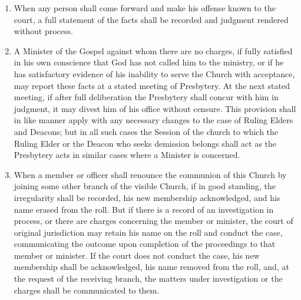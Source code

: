 \documentclass[
]{book}
\begin{document}
\begin{enumerate}
\def\labelenumi{\arabic{enumi}.}
\item
  \protect\hypertarget{42}{\href{}{}}When any person shall come forward and make his offense known to the court, a full statement of the facts shall be recorded and judgment rendered without process.
\item
  A Minister of the Gospel against whom there are no charges, if fully satisfied in his own conscience that God has not called him to the ministry, or if he has satisfactory evidence of his inability to serve the Church with acceptance, may report these facts at a stated meeting of Presbytery. At the next stated meeting, if after full deliberation the Presbytery shall concur with him in judgment, it may divest him of his office without censure. This provision shall in like manner apply with any necessary changes to the case of Ruling Elders and Deacons; but in all such cases the Session of the church to which the Ruling Elder or the Deacon who seeks demission belongs shall act as the Presbytery acts in similar cases where a Minister is concerned.
\item
  When a member or officer shall renounce the communion of this Church by joining some other branch of the visible Church, if in good standing, the irregularity shall be recorded, his new membership acknowledged, and his name erased from the roll. But if there is a record of an investigation in process, or there are charges concerning the member or minister, the court of original jurisdiction may retain his name on the roll and conduct the case, communicating the outcome upon completion of the proceedings to that member or minister. If the court does not conduct the case, his new membership shall be acknowledged, his name removed from the roll, and, at the request of the receiving branch, the matters under investigation or the charges shall be communicated to them.


\end{enumerate}
\end{document}

